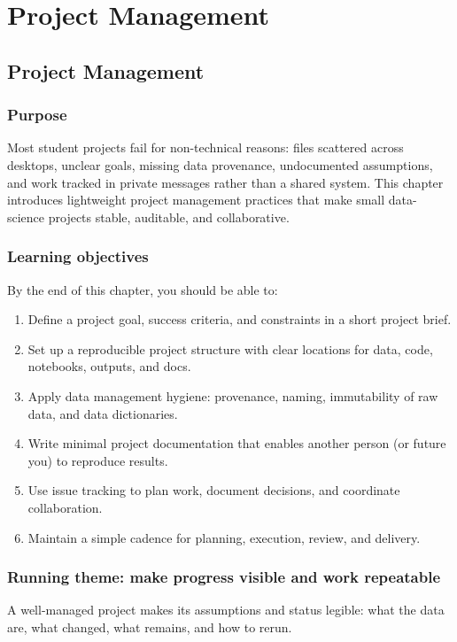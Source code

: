 \part{Project Management}
\chapter{Project Management}
\label{ch:project-management}

\section*{Purpose}
Most student projects fail for non-technical reasons: files scattered across desktops, unclear goals, missing data provenance, undocumented assumptions, and work tracked in private messages rather than a shared system. This chapter introduces lightweight project management practices that make small data-science projects stable, auditable, and collaborative.

\section*{Learning objectives}
By the end of this chapter, you should be able to:
\begin{enumerate}
\item Define a project goal, success criteria, and constraints in a short project brief.
\item Set up a reproducible project structure with clear locations for data, code, notebooks, outputs, and docs.
\item Apply data management hygiene: provenance, naming, immutability of raw data, and data dictionaries.
\item Write minimal project documentation that enables another person (or future you) to reproduce results.
\item Use issue tracking to plan work, document decisions, and coordinate collaboration.
\item Maintain a simple cadence for planning, execution, review, and delivery.
\end{enumerate}

\section*{Running theme: make progress visible and work repeatable}
A well-managed project makes its assumptions and status legible: what the data are, what changed, what remains, and how to rerun.

